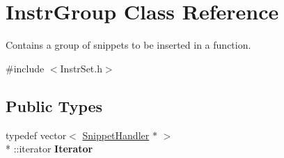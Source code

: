 \hypertarget{class_instr_group}{\section{Instr\-Group Class Reference}
\label{class_instr_group}
}


Contains a group of snippets to be inserted in a function.  




{\ttfamily \#include $<$Instr\-Set.\-h$>$}

\subsection*{Public Types}
\begin{DoxyCompactItemize}
\item 
\hypertarget{class_instr_group_a4ef84ae062f916504d1cdd6f5f6437d7}{typedef vector$<$ \hyperlink{class_snippet_handler}{Snippet\-Handler} $\ast$ $>$\\*
\-::iterator {\bfseries Iterator}}\label{class_instr_group_a4ef84ae062f916504d1cdd6f5f6437d7}

\end{DoxyCompactItemize}
